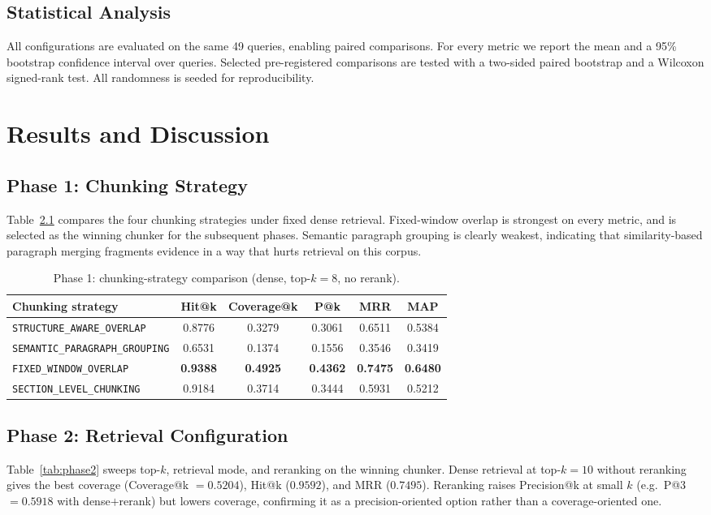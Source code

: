 \documentclass[12pt,a4paper,titlepage,oneside]{book}
\begin{document}
\section{Statistical Analysis}
All configurations are evaluated on the same 49 queries, enabling paired comparisons. For every metric we report the mean and a 95\% bootstrap confidence interval over queries. Selected pre-registered comparisons are tested with a two-sided paired bootstrap and a Wilcoxon signed-rank test. All randomness is seeded for reproducibility.

\chapter{Results and Discussion}

\section{Phase 1: Chunking Strategy}
Table~\ref{tab:phase1} compares the four chunking strategies under fixed dense retrieval. Fixed-window overlap is strongest on every metric, and is selected as the winning chunker for the subsequent phases. Semantic paragraph grouping is clearly weakest, indicating that similarity-based paragraph merging fragments evidence in a way that hurts retrieval on this corpus.

\begin{table}[htbp]
\centering
\caption{Phase 1: chunking-strategy comparison (dense, top-$k=8$, no rerank).}
\label{tab:phase1}
\begin{tabular}{lccccc}
\toprule
Chunking strategy & Hit@k & Coverage@k & P@k & MRR & MAP \\
\midrule
\texttt{STRUCTURE\_AWARE\_OVERLAP} & 0.8776 & 0.3279 & 0.3061 & 0.6511 & 0.5384 \\
\texttt{SEMANTIC\_PARAGRAPH\_GROUPING} & 0.6531 & 0.1374 & 0.1556 & 0.3546 & 0.3419 \\
\texttt{FIXED\_WINDOW\_OVERLAP} & \textbf{0.9388} & \textbf{0.4925} & \textbf{0.4362} & \textbf{0.7475} & \textbf{0.6480} \\
\texttt{SECTION\_LEVEL\_CHUNKING} & 0.9184 & 0.3714 & 0.3444 & 0.5931 & 0.5212 \\
\bottomrule
\end{tabular}
\end{table}

\section{Phase 2: Retrieval Configuration}
Table~\ref{tab:phase2} sweeps top-$k$, retrieval mode, and reranking on the winning chunker. Dense retrieval at top-$k=10$ without reranking gives the best coverage (Coverage@k $=0.5204$), Hit@k ($0.9592$), and MRR ($0.7495$). Reranking raises Precision@k at small $k$ (e.g.\ P@3 $=0.5918$ with dense$+$rerank) but lowers coverage, confirming it as a precision-oriented option rather than a coverage-oriented one.
\end{document}
